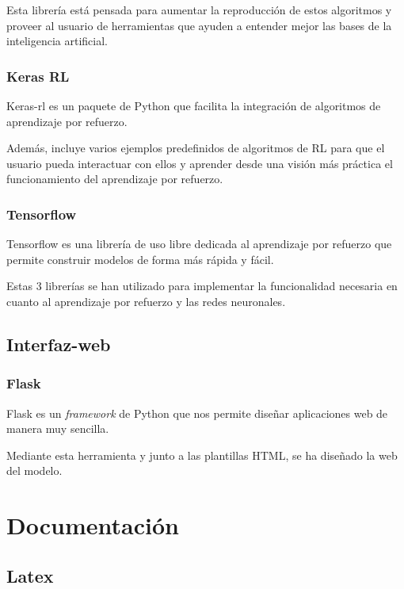 Esta librería está pensada para aumentar la reproducción de estos algoritmos y proveer al usuario de herramientas que ayuden a entender mejor las bases de la inteligencia artificial.

\subsubsection{Keras RL}

Keras-rl es un paquete de Python que facilita la integración de algoritmos de aprendizaje por refuerzo.

Además, incluye varios ejemplos predefinidos de algoritmos de RL para que el usuario pueda interactuar con ellos y aprender desde una visión más práctica el funcionamiento del aprendizaje por refuerzo.

\subsubsection{Tensorflow}

Tensorflow es una librería de uso libre dedicada al aprendizaje por refuerzo que permite construir modelos de forma más rápida y fácil.

Estas 3 librerías se han utilizado para implementar la funcionalidad necesaria en cuanto al aprendizaje por refuerzo y las redes neuronales.

\subsection{Interfaz-web}

\subsubsection{Flask}

Flask\cite{Flask} es un \textit{framework} de Python que nos permite diseñar aplicaciones web de manera muy sencilla.

Mediante esta herramienta y junto a las plantillas HTML, se ha diseñado la web del modelo.


\section{Documentación}

\subsection{Latex}

